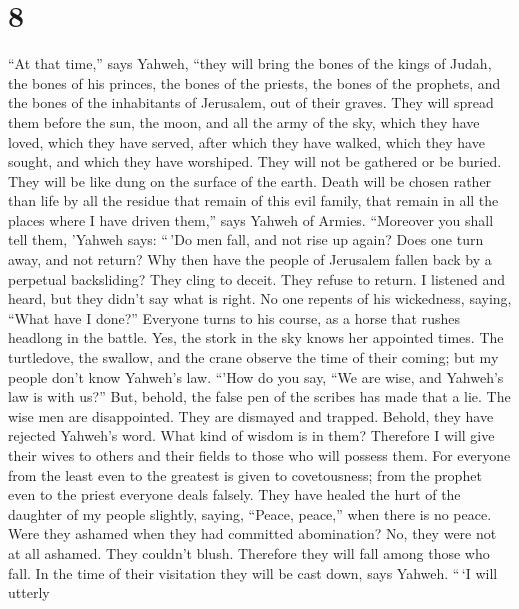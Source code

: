 \hypertarget{section-7}{%
\section{8}\label{section-7}}

 ``At that time,'' says Yahweh, ``they will bring the
bones of the kings of Judah, the bones of his princes, the bones of the
priests, the bones of the prophets, and the bones of the inhabitants of
Jerusalem, out of their graves.  They will spread them
before the sun, the moon, and all the army of the sky, which they have
loved, which they have served, after which they have walked, which they
have sought, and which they have worshiped. They will not be gathered or
be buried. They will be like dung on the surface of the earth.
 Death will be chosen rather than life by all the residue
that remain of this evil family, that remain in all the places where I
have driven them,'' says Yahweh of Armies.  ``Moreover you
shall tell them, 'Yahweh says: ``\,'Do men fall, and not rise up again?
Does one turn away, and not return?  Why then have the
people of Jerusalem fallen back by a perpetual backsliding? They cling
to deceit. They refuse to return.  I listened and heard,
but they didn't say what is right. No one repents of his wickedness,
saying, ``What have I done?'' Everyone turns to his course, as a horse
that rushes headlong in the battle.  Yes, the stork in the
sky knows her appointed times. The turtledove, the swallow, and the
crane observe the time of their coming; but my people don't know
Yahweh's law.  ``'How do you say, ``We are wise, and
Yahweh's law is with us?'' But, behold, the false pen of the scribes has
made that a lie.  The wise men are disappointed. They are
dismayed and trapped. Behold, they have rejected Yahweh's word. What
kind of wisdom is in them?  Therefore I will give their
wives to others and their fields to those who will possess them. For
everyone from the least even to the greatest is given to covetousness;
from the prophet even to the priest everyone deals falsely.
 They have healed the hurt of the daughter of my people
slightly, saying, ``Peace, peace,'' when there is no peace.
 Were they ashamed when they had committed abomination?
No, they were not at all ashamed. They couldn't blush. Therefore they
will fall among those who fall. In the time of their visitation they
will be cast down, says Yahweh.  ``\,`I will utterly
